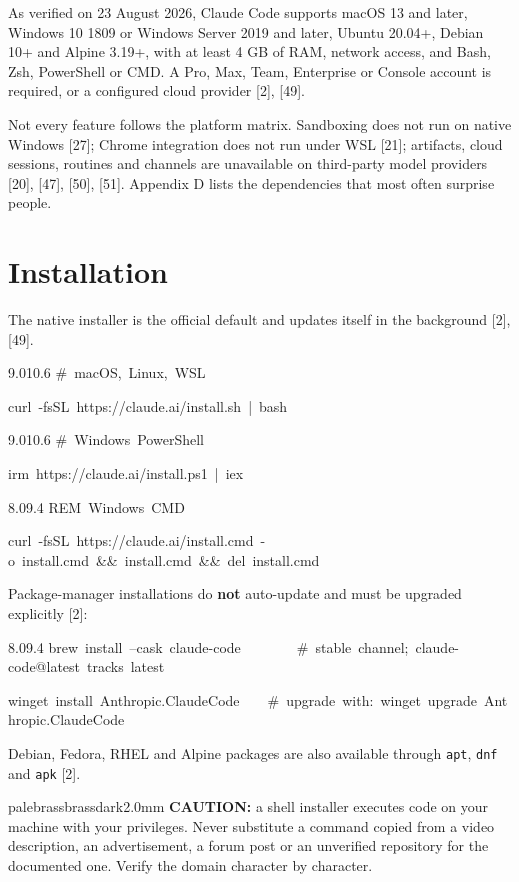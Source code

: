 \documentclass[11pt,a4paper,twoside,openany]{book}
\newcommand{\cl}[1]{\noindent\mbox{#1}\par}
\begin{document}
As verified on 23 August 2026, Claude Code supports macOS 13 and later, Windows 10 1809 or Windows Server 2019 and later, Ubuntu 20.04+, Debian 10+ and Alpine 3.19+, with at least 4 GB of RAM, network access, and Bash, Zsh, PowerShell or CMD. A Pro, Max, Team, Enterprise or Console account is required, or a configured cloud provider [2], [49].


Not every feature follows the platform matrix. Sandboxing does not run on native Windows [27]; Chrome integration does not run under WSL [21]; artifacts, cloud sessions, routines and channels are unavailable on third-party model providers [20], [47], [50], [51]. Appendix D lists the dependencies that most often surprise people.


\FloatBarrier
\setcounter{section}{1}
\section{Installation}

The native installer is the official default and updates itself in the background [2], [49].


\begin{codeblock}{9.0}{10.6}
\cl{\#~macOS,~Linux,~WSL}
\cl{curl~-fsSL~https://claude.ai/install.sh~|~bash}
\end{codeblock}

\begin{codeblock}{9.0}{10.6}
\cl{\#~Windows~PowerShell}
\cl{irm~https://claude.ai/install.ps1~|~iex}
\end{codeblock}

\begin{codeblock}{8.0}{9.4}
\cl{REM~Windows~CMD}
\cl{curl~-fsSL~https://claude.ai/install.cmd~-o~install.cmd~\&\&~install.cmd~\&\&~del~install.cmd}
\end{codeblock}

Package-manager installations do \textbf{not} auto-update and must be upgraded explicitly [2]:


\begin{codeblock}{8.0}{9.4}
\cl{brew~install~--cask~claude-code~~~~~~~~\#~stable~channel;~claude-code@latest~tracks~latest}
\cl{winget~install~Anthropic.ClaudeCode~~~~\#~upgrade~with:~winget~upgrade~Anthropic.ClaudeCode}
\end{codeblock}

Debian, Fedora, RHEL and Alpine packages are also available through \texttt{apt}, \texttt{dnf} and \texttt{apk} [2].


\begin{calloutbox}{palebrass}{brassdark}{2.0mm}
\textbf{CAUTION:} a shell installer executes code on your machine with your privileges. Never substitute a command copied from a video description, an advertisement, a forum post or an unverified repository for the documented one. Verify the domain character by character.
\end{calloutbox}
\end{document}
